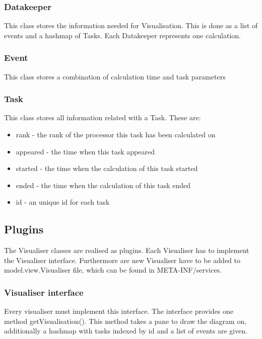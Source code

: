 \documentclass{article}
\begin{document}
\subsubsection{Datakeeper}
This class stores the information needed for Visualisation. This is done as a list of events  and a hashmap of Tasks. Each Datakeeper represents one calculation.

\subsubsection{Event}
This class stores a combination of calculation time and task parameters

\subsubsection{Task}
This class stores all information related with a Task.
These are:
\begin{itemize}
\item rank - the rank of the processor this task has been calculated on
\item appeared - the time when this task appeared
\item started - the time when the calculation of this task started
\item ended - the time when the calculation of this task ended
\item id - an unique id for each task
\end{itemize}


\subsection{Plugins}
The Visualiser classes are realised as plugins. Each Visualiser has to implement the Visualiser interface. Furthermore are new Visualiser have to be added to model.view.Visualiser file, which can be found in META-INF/services.

\subsubsection{Visualiser interface}
Every visualiser must implement this interface. The interface provides one method getVisualisation(). This method takes a pane to draw the diagram on, additionally a hashmap with tasks indexed by id and a list of events are given.
\end{document}
